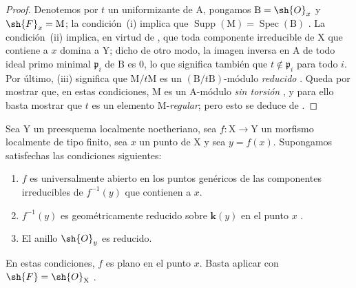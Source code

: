 \begin{proof}
Denotemos por $t$ un uniformizante de $\mathrm{A}$, pongamos $\mathrm{B}=\sh{O}_x$ y $\sh{F}_x=\mathrm{M}$; la condición~(i) implica que $\operatorname{Supp}(\mathrm{M})=\operatorname{Spec}(\mathrm{B})$ .
La condición~(ii) implica, en virtud de , que toda componente irreducible de $\mathrm{X}$ que contiene a $x$ domina a $\mathrm{Y}$; dicho de otro modo, la imagen inversa en $\mathrm{A}$ de todo ideal primo minimal $\mathfrak{p}_i$ de $\mathrm{B}$ es $0$, lo que significa también que $t\notin\mathfrak{p}_i$ para todo $i$. Por último, (iii) significa que $\mathrm{M}/t\mathrm{M}$ es un $(\mathrm{B}/t\mathrm{B})$-módulo \emph{reducido} .
Queda por mostrar que, en estas condiciones, $\mathrm{M}$ es un $\mathrm{A}$-módulo \emph{sin torsión} , y para ello basta mostrar que $t$ es un elemento $\mathrm{M}$-\emph{regular}; pero esto se deduce de .
\end{proof}

\begin{corollary}[15.2.3]
\label{IV.15.2.3}
Sea $\mathrm{Y}$ un preesquema localmente noetheriano, sea $f:\mathrm{X}\to\mathrm{Y}$ un morfismo localmente de tipo finito, sea $x$ un punto de $\mathrm{X}$ y sea $y=f(x)$.
Supongamos satisfechas las condiciones siguientes:
\begin{enumerate}[label=\textup{(\roman*)}]
  \item $f$ es universalmente abierto en los puntos genéricos de las componentes irreducibles de $f^{-1}(y)$ que contienen a $x$.
  \item $f^{-1}(y)$ es geométricamente reducido sobre $\boldsymbol{k}(y)$ en el punto $x$ .
  \item El anillo $\sh{O}_y$ es reducido.
\end{enumerate}
En estas condiciones, $f$ es plano en el punto $x$.
Basta aplicar  con $\sh{F}=\sh{O}_\mathrm{X}$ .
\end{corollary}

